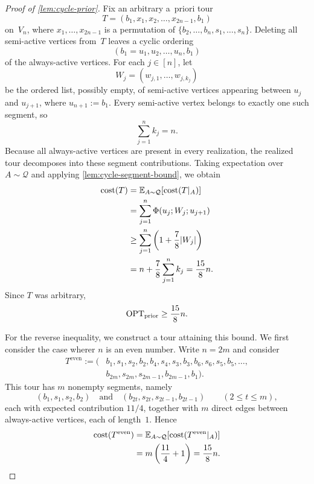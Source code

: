 \documentclass[12pt,a4paper,oneside]{report}
\begin{document}
\begin{proof}[Proof of \cref{lem:cycle-prior}]
Fix an arbitrary a~priori tour
\[
    T=(b_1,x_1,x_2,\dots,x_{2n-1},b_1)
\]
on~$V_n$, where $x_1,\dots,x_{2n-1}$ is a permutation of
$\{b_2,\dots,b_n,s_1,\dots,s_n\}$.  Deleting all semi-active vertices
from~$T$ leaves a cyclic ordering
\[
    (b_1=u_1,u_2,\dots,u_n,b_1)
\]
of the always-active vertices.  For each $j\in[n]$, let
\[
    W_j=(w_{j,1},\dots,w_{j,k_j})
\]
be the ordered list, possibly empty, of semi-active vertices appearing
between $u_j$ and $u_{j+1}$, where $u_{n+1}:=b_1$.  Every semi-active
vertex belongs to exactly one such segment, so
\[
    \sum_{j=1}^n k_j=n.
\]
Because all always-active vertices are present in every realization, the realized
tour decomposes into these segment contributions.  Taking expectation over
$A\sim\mathcal Q$ and applying
\cref{lem:cycle-segment-bound}, we obtain
\begin{align*}
    \operatorname{cost}(T)
    &=\mathbb{E}_{A\sim\mathcal Q}[\operatorname{cost}(T|_A)]\\
    &=
    \sum_{j=1}^n\Phi(u_j;W_j;u_{j+1})\\
    &\ge
    \sum_{j=1}^n\left(1+\frac{7}{8}|W_j|\right)\\
    &=n+\frac78\sum_{j=1}^nk_j
    =
    \frac{15}{8}n.
\end{align*}
Since $T$ was arbitrary,
\[
    \operatorname{OPT}_\mathrm{prior}\ge\frac{15}{8}n.
\]

For the reverse inequality, we construct a tour attaining this bound.
We first consider the case wherer $n$ is an even number.
Write $n=2m$ and consider
\begin{align*}
T^{\mathrm{even}}
:=(&b_1,s_1,s_2,b_2,
   b_4,s_4,s_3,b_3,
   b_6,s_6,s_5,b_5,
   \dots,\\
  &b_{2m},s_{2m},s_{2m-1},b_{2m-1},b_1).
\end{align*}
This tour has $m$ nonempty segments, namely
\[
    (b_1,s_1,s_2,b_2)
    \quad\text{and}\quad
    (b_{2t},s_{2t},s_{2t-1},b_{2t-1})
    \qquad(2\le t\le m),
\]
each with expected contribution $11/4$, together with $m$ direct edges
between always-active vertices, each of length~$1$.  Hence
\begin{align*}
    \operatorname{cost}(T^{\mathrm{even}})
    &=\mathbb{E}_{A\sim\mathcal Q}[\operatorname{cost}(T^{\mathrm{even}}|_A)]\\
    &=
    m\left(\frac{11}{4}+1\right)
    =
    \frac{15}{8}n.
\end{align*}


\end{proof}
\end{document}
